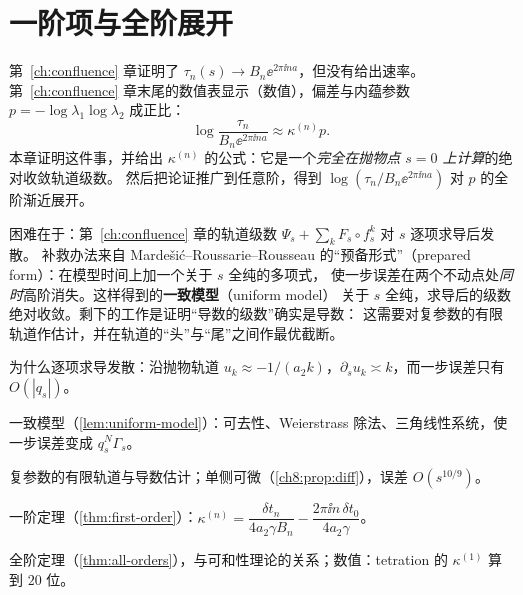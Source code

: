 \providecommand{\cfR}{\mathcal R}
\providecommand{\cfS}{\mathcal S}
\providecommand{\cfG}{\mathcal G}
\providecommand{\cfA}{\mathcal A}     %
\providecommand{\Arg}{\operatorname{Arg}}

\chapter{一阶项与全阶展开}\label{ch:first-order}

第~\ref{ch:confluence} 章证明了 $\tau_n(s)\to B_n\ee^{2\pi\ii na}$，但没有给出速率。
第~\ref{ch:confluence} 章末尾的数值表显示（数值），偏差与内蕴参数 $p=-\log\lambda_1\log\lambda_2$ 成正比：
\[
 \log\frac{\tau_n}{B_n\ee^{2\pi\ii na}}\approx\kappa^{(n)}p .
\]
本章证明这件事，并给出 $\kappa^{(n)}$ 的公式：它是一个\emph{完全在抛物点 $s=0$ 上计算}的绝对收敛轨道级数。
然后把论证推广到任意阶，得到 $\log(\tau_n/B_n\ee^{2\pi\ii na})$ 对 $p$ 的全阶渐近展开。

困难在于：第~\ref{ch:confluence} 章的轨道级数 $\Psi_s+\sum_kF_s\circ f_s^k$ 对 $s$ 逐项求导后发散。
补救办法来自 Mardešić--Roussarie--Rousseau 的``预备形式''（prepared form）：在模型时间上加一个关于 $s$ 全纯的多项式，
使一步误差在两个不动点处\emph{同时}高阶消失。这样得到的\textbf{一致模型}（uniform model）
关于 $s$ 全纯，求导后的级数绝对收敛。剩下的工作是证明``导数的级数''确实是导数：
这需要对复参数的有限轨道作估计，并在轨道的``头''与``尾''之间作最优截断。

\begin{goals}
\item 为什么逐项求导发散：沿抛物轨道 $u_k\approx-1/(a_2k)$，$\partial_su_k\asymp k$，而一步误差只有 $O(|q_s|)$。
\item 一致模型（\cref{lem:uniform-model}）：可去性、Weierstrass 除法、三角线性系统，使一步误差变成 $q_s^N\Gamma_s$。
\item 复参数的有限轨道与导数估计；单侧可微（\cref{ch8:prop:diff}），误差 $O(s^{10/9})$。
\item 一阶定理（\cref{thm:first-order}）：$\kappa^{(n)}=\dfrac{\delta t_n}{4a_2\gamma B_n}-\dfrac{2\pi\ii n\,\delta t_0}{4a_2\gamma}$。
\item 全阶定理（\cref{thm:all-orders}），与可和性理论的关系；数值：tetration 的 $\kappa^{(1)}$ 算到 $20$ 位。
\end{goals}

